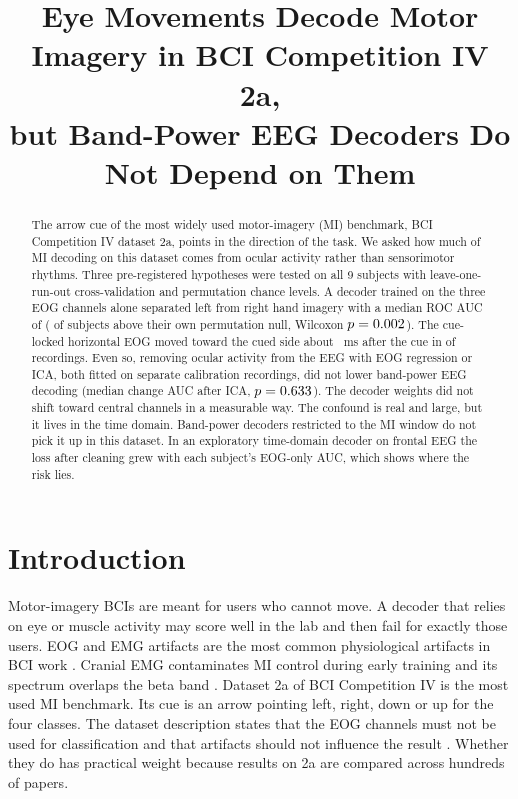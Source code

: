 \documentclass[conference]{IEEEtran}
\begin{document}
\title{Eye Movements Decode Motor Imagery in BCI Competition IV 2a,\\ but Band-Power EEG Decoders Do Not Depend on Them}

\author{
}

\maketitle

\begin{abstract}
The arrow cue of the most widely used motor-imagery (MI) benchmark, BCI Competition IV dataset 2a, points in the direction of the task. We asked how much of MI decoding on this dataset comes from ocular activity rather than sensorimotor rhythms. Three pre-registered hypotheses were tested on all 9 subjects with leave-one-run-out cross-validation and permutation chance levels. A decoder trained on the three EOG channels alone separated left from right hand imagery with a median ROC AUC of \AucEogNoneT{} (\HoneAbove{} of \HoneN{} subjects above their own permutation null, Wilcoxon $p=0.002{}$). The cue-locked horizontal EOG moved toward the cued side about \HeogPeak{}~ms after the cue in \HeogPos{} of \NRecordings{} recordings. Even so, removing ocular activity from the EEG with EOG regression or ICA, both fitted on separate calibration recordings, did not lower band-power EEG decoding (median change \HtwoDeltaIca{} AUC after ICA, $p=0.633{}$). The decoder weights did not shift toward central channels in a measurable way. The confound is real and large, but it lives in the time domain. Band-power decoders restricted to the MI window do not pick it up in this dataset. In an exploratory time-domain decoder on frontal EEG the loss after cleaning grew with each subject's EOG-only AUC, which shows where the risk lies.
\end{abstract}

\section{Introduction}
Motor-imagery BCIs are meant for users who cannot move. A decoder that relies on eye or muscle activity may score well in the lab and then fail for exactly those users. EOG and EMG artifacts are the most common physiological artifacts in BCI work \cite{fatourechi2007}. Cranial EMG contaminates MI control during early training \cite{mcfarland2005} and its spectrum overlaps the beta band \cite{goncharova2003}. Dataset 2a of BCI Competition IV \cite{brunner2008,tangermann2012} is the most used MI benchmark. Its cue is an arrow pointing left, right, down or up for the four classes. The dataset description states that the EOG channels must not be used for classification and that artifacts should not influence the result \cite{brunner2008}. Whether they do has practical weight because results on 2a are compared across hundreds of papers.
\end{document}
